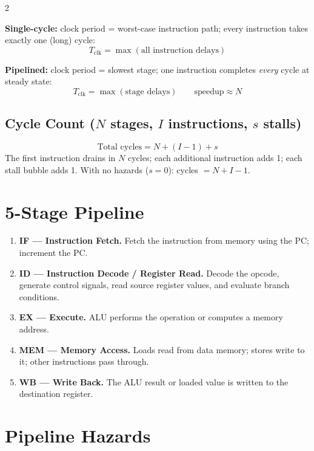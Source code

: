 \documentclass[9pt]{article}
\begin{document}
\begin{multicols}{2}

\textbf{Single-cycle:} clock period = worst-case instruction path; every instruction takes exactly one (long) cycle:
$$T_{\text{clk}} = \max(\text{all instruction delays})$$

\textbf{Pipelined:} clock period = slowest stage; one instruction completes \emph{every} cycle at steady state:
$$T_{\text{clk}} = \max(\text{stage delays})\qquad \text{speedup} \approx N$$

\columnbreak

\subsection{Cycle Count ($N$ stages, $I$ instructions, $s$ stalls)}
$$\boxed{\text{Total cycles} = N + (I-1) + s}$$
The first instruction drains in $N$ cycles; each additional instruction adds 1; each stall bubble adds 1. With no hazards ($s=0$): cycles $= N + I - 1$.

\end{multicols}

\section{5-Stage Pipeline}

\begin{enumerate}
  \item \textbf{IF --- Instruction Fetch.} Fetch the instruction from memory using the PC; increment the PC.
  \item \textbf{ID --- Instruction Decode / Register Read.} Decode the opcode, generate control signals, read source register values, and evaluate branch conditions.
  \item \textbf{EX --- Execute.} ALU performs the operation or computes a memory address.
  \item \textbf{MEM --- Memory Access.} Loads read from data memory; stores write to it; other instructions pass through.
  \item \textbf{WB --- Write Back.} The ALU result or loaded value is written to the destination register.
\end{enumerate}

\section{Pipeline Hazards}
\end{document}
